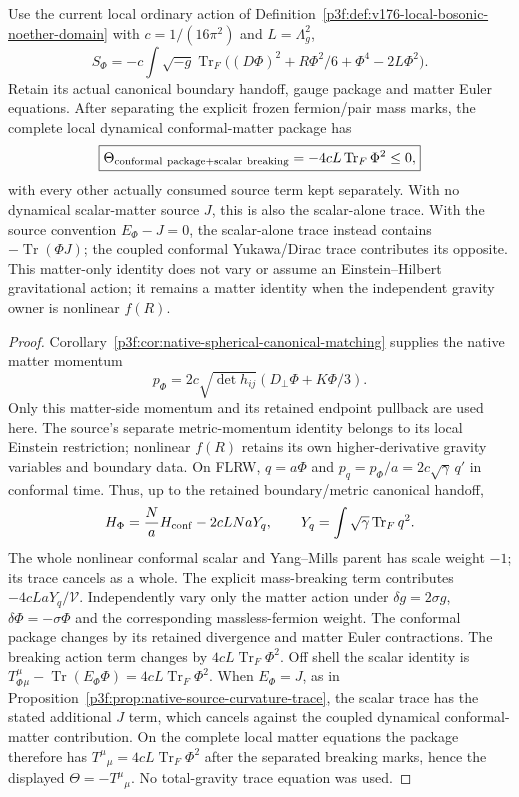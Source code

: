 \documentclass[12pt,a4paper]{article}
\begin{document}
\begin{proposition}
\label{p8:prop:v2189-c06-classical-scalar-sign}
Use the current local ordinary action of
Definition~\ref{p3f:def:v176-local-bosonic-noether-domain} with
$c=1/(16\pi^2)$ and $L=\Lambda_g^2$,
\[
 S_\Phi=-c\int\sqrt{-g}\operatorname{Tr}_F
 \big((D\Phi)^2+R\Phi^2/6+\Phi^4-2L\Phi^2\big).
\]
Retain its actual canonical boundary handoff, gauge package and matter
Euler equations. After separating the explicit frozen fermion/pair mass
marks, the complete local dynamical conformal-matter package has
\[
 \boxed{\Theta_{\rm conformal\ package+scalar\ breaking}
       =-4cL\operatorname{Tr}_F\Phi^2\le0,}
\]
with every other actually consumed source term kept separately. With no
dynamical scalar-matter source $J$, this is also the scalar-alone trace.
With the source convention $E_\Phi-J=0$, the scalar-alone trace instead
contains $-\operatorname{Tr}(\Phi J)$; the coupled conformal Yukawa/Dirac
trace contributes its opposite. This matter-only identity does not
vary or assume an Einstein--Hilbert gravitational action; it remains a
matter identity when the independent gravity owner is nonlinear $f(R)$.
\end{proposition}
\begin{proof}
Corollary~\ref{p3f:cor:native-spherical-canonical-matching} supplies the
native matter momentum
\[
 p_\Phi=2c\sqrt{\det h_{ij}}(D_\perp\Phi+K\Phi/3).
\]
Only this matter-side momentum and its retained endpoint pullback are used
here. The source's separate metric-momentum identity belongs to its local
Einstein restriction; nonlinear $f(R)$ retains its own higher-derivative
gravity variables and boundary data.
On FLRW, $q=a\Phi$ and $p_q=p_\Phi/a=2c\sqrt\gamma\,q'$ in
conformal time. Thus, up to the retained boundary/metric canonical handoff,
\[
 H_\Phi=\frac Na H_{\rm conf}-2cLN aY_q,
 \qquad Y_q=\int\sqrt\gamma\operatorname{Tr}_F q^2.
\]
The whole nonlinear conformal scalar and Yang--Mills parent has scale
weight $-1$; its trace cancels as a whole. The explicit mass-breaking
term contributes $-4cL aY_q/\mathcal V$.
Independently vary only the matter action under
$\delta g=2\sigma g$, $\delta\Phi=-\sigma\Phi$ and the corresponding
massless-fermion weight. The conformal package changes by its retained
divergence and matter Euler contractions. The breaking action term changes
by $4cL\operatorname{Tr}_F\Phi^2$. Off shell the scalar identity is
$T_\Phi^\mu{}_{\mu}-\operatorname{Tr}(E_\Phi\Phi)=4cL\operatorname{Tr}_F\Phi^2$.
When $E_\Phi=J$, as in
Proposition~\ref{p3f:prop:native-source-curvature-trace}, the scalar trace
has the stated additional $J$ term,
which cancels against the coupled dynamical conformal-matter contribution.
On the complete local matter equations the package therefore has
$T^\mu{}_{\mu}=4cL\operatorname{Tr}_F\Phi^2$ after the separated
breaking marks, hence the displayed $\Theta=-T^\mu{}_{\mu}$.
No total-gravity trace equation was used.
\end{proof}
\end{document}
